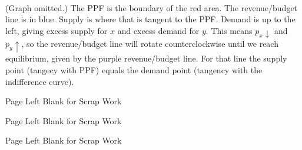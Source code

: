 \documentclass[addpoints,answers,12pt]{exam}
\begin{document}
\begin{questions}
\vspace{1em}
\begin{solution}[6cm]
\\
(Graph omitted.) The PPF is the boundary of the red area. The revenue/budget line is in blue. Supply is where that is tangent to the PPF. Demand is up to the left, giving excess supply for $x$ and excess demand for $y$. This means $p_x\downarrow$ and $p_y\uparrow$, so the revenue/budget line will rotate counterclockwise until we reach equilibrium, given by the purple revenue/budget line. For that line the supply point (tangecy with PPF) equals the demand point (tangency with the indifference curve).

\end{solution}

\newpage
\centering Page Left Blank for Scrap Work

\newpage
\centering Page Left Blank for Scrap Work

\newpage
\centering Page Left Blank for Scrap Work



\end{questions}
\end{document}
